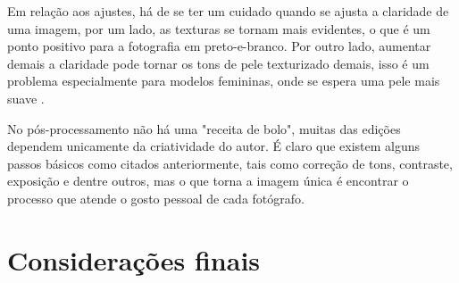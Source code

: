 \documentclass[
	article,			%
	12pt,				%
	oneside,			%
	a4paper,			%
	english,			%
	brazil,				%
	sumario=tradicional
	]{abntex2}
\begin{document}
Em relação aos ajustes, há de se ter um cuidado quando se ajusta a claridade de uma imagem, por um lado, as texturas se tornam mais evidentes, o que é um ponto positivo para a fotografia em preto-e-branco. Por outro lado, aumentar demais a claridade pode tornar os tons de pele texturizado demais, isso é um problema especialmente para modelos femininas, onde se espera uma pele mais suave \cite{SITE5TIPS}.

No pós-processamento não há uma "receita de bolo", muitas das edições dependem unicamente da criatividade do autor. É claro que existem alguns passos básicos como citados anteriormente, tais como correção de tons, contraste, exposição e dentre outros, mas o que torna a imagem única é encontrar o processo que atende o gosto pessoal de cada fotógrafo. 

% 

\section*{Considerações finais}

\lipsum[1]

\begin{citacao}
\lipsum[2]
\end{citacao}

\lipsum[3]
\newpage
\postextual


\end{document}
